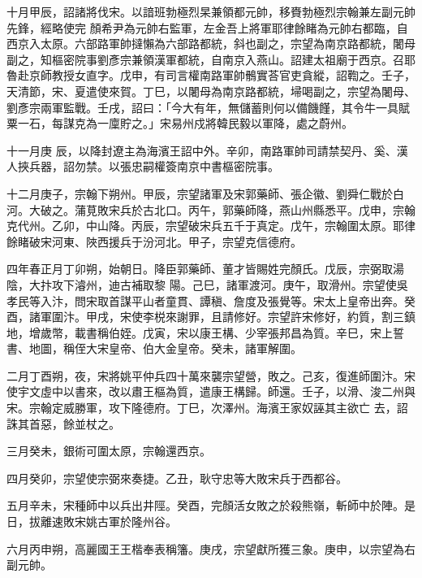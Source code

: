 \begin{pinyinscope}
 十月甲辰，詔諸將伐宋。以諳班勃極烈杲兼領都元帥，移賚勃極烈宗翰兼左副元帥先鋒，經略使完
 顏希尹為元帥右監軍，左金吾上將軍耶律餘睹為元帥右都臨，自西京入太原。六部路軍帥撻懶為六部路都統，斜也副之，宗望為南京路都統，闍母副之，知樞密院事劉彥宗兼領漢軍都統，自南京入燕山。詔建太祖廟于西京。召耶魯赴京師教授女直字。戊申，有司言權南路軍帥鶻實荅官吏貪縱，詔鞫之。壬子，天清節，宋、夏遣使來賀。丁巳，以闍母為南京路都統，埽喝副之，宗望為闍母、劉彥宗兩軍監戰。壬戌，詔曰：「今大有年，無儲蓄則何以備饑饉，其令牛一具賦粟一石，每謀克為一廩貯之。」宋易州戍將韓民毅以軍降，處之蔚州。



 十一月庚
 辰，以降封遼主為海濱王詔中外。辛卯，南路軍帥司請禁契丹、奚、漢人挾兵器，詔勿禁。以張忠嗣權簽南京中書樞密院事。



 十二月庚子，宗翰下朔州。甲辰，宗望諸軍及宋郭藥師、張企徽、劉舜仁戰於白河。大破之。蒲莧敗宋兵於古北口。丙午，郭藥師降，燕山州縣悉平。戊申，宗翰克代州。乙卯，中山降。丙辰，宗望破宋兵五千于真定。戊午，宗翰圍太原。耶律餘睹破宋河東、陜西援兵于汾河北。甲子，宗望克信德府。



 四年春正月丁卯朔，始朝日。降臣郭藥師、董才皆賜姓完顏氏。戊辰，宗弼取湯陰，大抃攻下濬州，迪古補取黎
 陽。己巳，諸軍渡河。庚午，取滑州。宗望使吳孝民等入汴，問宋取首謀平山者童貫、譚稹、詹度及張覺等。宋太上皇帝出奔。癸酉，諸軍圍汴。甲戌，宋使李棁來謝罪，且請修好。宗望許宋修好，約質，割三鎮地，增歲幣，載書稱伯姪。戊寅，宋以康王構、少宰張邦昌為質。辛巳，宋上誓書、地圖，稱侄大宋皇帝、伯大金皇帝。癸未，諸軍解圍。



 二月丁酉朔，夜，宋將姚平仲兵四十萬來襲宗望營，敗之。己亥，復進師圍汴。宋使宇文虛中以書來，改以肅王樞為質，遣康王構歸。師還。壬子，以滑、浚二州與宋。宗翰定威勝軍，攻下隆德府。丁巳，次澤州。海濱王家奴誣其主欲亡
 去，詔誅其首惡，餘並杖之。



 三月癸未，銀術可圍太原，宗翰還西京。



 四月癸卯，宗望使宗弼來奏捷。乙丑，耿守忠等大敗宋兵于西都谷。



 五月辛未，宋種師中以兵出井陘。癸酉，完顏活女敗之於殺熊嶺，斬師中於陣。是日，拔離速敗宋姚古軍於隆州谷。



 六月丙申朔，高麗國王王楷奉表稱籓。庚戌，宗望獻所獲三象。庚申，以宗望為右副元帥。




\end{pinyinscope}
